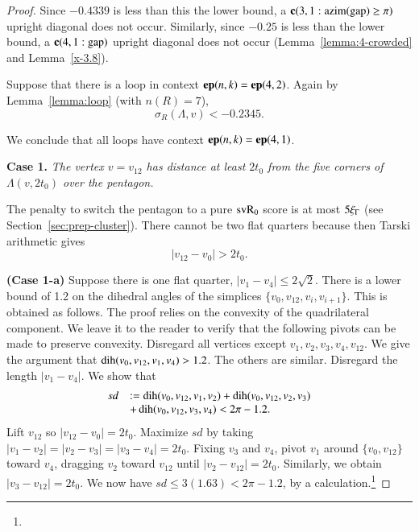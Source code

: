 \begin{proof}
Since $-0.4339$ is less than this the lower bound, a ${\operatorname{\bf c}}{(3,1: {\operatorname{azim}}({\operatorname{gap}}) \ge \pi)}$
upright diagonal does not occur. Similarly, since $-0.25$ is less
than the lower bound, a ${\operatorname{\bf c}}{(4,1:{\operatorname{gap}})}$ upright diagonal does not
occur (Lemma~\ref{lemma:4-crowded} and Lemma~\ref{x-3.8}).

Suppose that there is a loop in context ${\operatorname{\bf ep}}{(n,k)}={\operatorname{\bf ep}}{(4,2)}$. Again by
Lemma~\ref{lemma:loop} (with $n(R)=7$),
$$\sigma_R(\Lambda,v)  < -0.2345.$$


We conclude that all loops have context ${\operatorname{\bf ep}}{(n,k)}={\operatorname{\bf ep}}{(4,1)}$.


{\bf Case 1.}  {\it The vertex $v=v_{12}$ has distance at least
$2t_0$ from the five corners of $\Lambda(v,2t_0)$ over the pentagon.}


The penalty to switch the pentagon to a pure ${\operatorname{svR}}_0$ score is at
most $5\xi_\Gamma$ (see Section~\ref{sec:prep-cluster}).  There cannot
be two flat quarters because then Tarski arithmetic gives
$$|v_{12}-v_0|>2t_0.$$


{\bf (Case 1-a)} Suppose there is one flat quarter,
$|v_1-v_4|\le2\sqrt2$. There is a lower bound of 1.2 on the
dihedral angles of the simplices $\{v_0,v_{12},v_i,v_{i+1}\}$.  This
is obtained as follows.  The proof relies on the convexity of the
quadrilateral component.  We leave it to the reader to verify that
the following pivots can be made to preserve convexity.  Disregard
all vertices except $v_1,v_2,v_3,v_4,v_{12}$.  We give the
argument that $\operatorname{dih}(v_0,v_{12},v_1,v_4)>1.2$.  The others are
similar. Disregard the length $|v_1-v_4|$.  We show that
    $$
    \begin{array}{lll}
        sd &:=\operatorname{dih}(v_0,v_{12},v_1,v_2)+\operatorname{dih}(v_0,v_{12},v_2,v_3)\\
           &+\operatorname{dih}(v_0,v_{12},v_3,v_4) < 2\pi-1.2.
    \end{array}
    $$
Lift $v_{12}$ so $|v_{12}-v_0|=2t_0$. Maximize $sd$ by taking
$|v_1-v_2|=|v_2-v_3|=|v_3-v_4|=2t_0$.  Fixing $v_3$ and $v_4$,
pivot $v_1$ around $\{v_0,v_{12}\}$ toward $v_4$, dragging $v_2$
toward $v_{12}$ until $|v_2-v_{12}|=2t_0$.  Similarly, we obtain
$|v_3-v_{12}|=2t_0$. We now have $sd\le 3(1.63)< 2\pi-1.2$, by a
calculation.\footnote{}


\end{proof}

